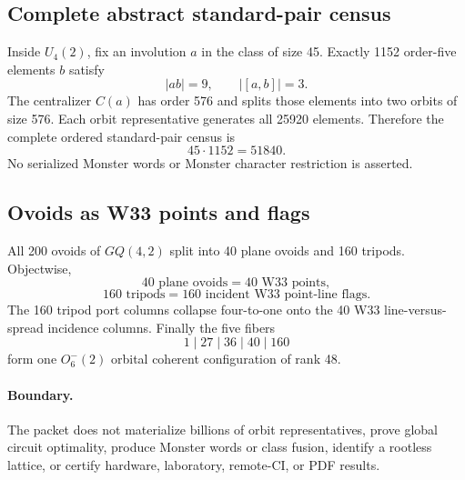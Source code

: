 \subsection{Complete abstract standard-pair census}
Inside $U_4(2)$, fix an involution $a$ in the class of size 45.  Exactly 1152 order-five elements $b$ satisfy
\[
|ab|=9,
\qquad |[a,b]|=3.
\]
The centralizer $C(a)$ has order 576 and splits those elements into two orbits of size 576.  Each orbit representative generates all 25920 elements.  Therefore the complete ordered standard-pair census is
\[
45\cdot1152=51840.
\]
No serialized Monster words or Monster character restriction is asserted.

\subsection{Ovoids as W33 points and flags}
All 200 ovoids of $GQ(4,2)$ split into 40 plane ovoids and 160 tripods.  Objectwise,
\[
40\text{ plane ovoids}=40\text{ W33 points},
\]
\[
160\text{ tripods}=160\text{ incident W33 point-line flags}.
\]
The 160 tripod port columns collapse four-to-one onto the 40 W33 line-versus-spread incidence columns.  Finally the five fibers
\[
1\mid27\mid36\mid40\mid160
\]
form one $O^-_6(2)$ orbital coherent configuration of rank 48.

\paragraph{Boundary.}
The packet does not materialize billions of orbit representatives, prove global circuit optimality, produce Monster words or class fusion, identify a rootless lattice, or certify hardware, laboratory, remote-CI, or PDF results.
